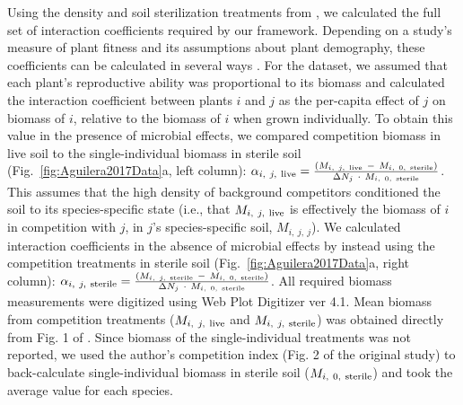 Using the density and soil sterilization treatments from \citet{Aguilera2017}, we calculated the full set of interaction coefficients required by our framework. Depending on a study's measure of plant fitness and its assumptions about plant demography, these coefficients can be calculated in several ways \citep{Weigelt2003}. For the \citet{Aguilera2017} dataset, we assumed that each plant's reproductive ability was proportional to its biomass and calculated the interaction coefficient between plants $i$ and $j$ as the per-capita effect of $j$ on biomass of $i$, relative to the biomass of $i$ when grown individually. To obtain this value in the presence of microbial effects, we compared competition biomass in live soil to the single-individual biomass in sterile soil (Fig.~\ref{fig:Aguilera2017Data}a, left column): $\alpha_{i,\ j,\ \textup{live}} = \frac{(M_{i,\ j,\ \textup{live}}\ -\ M_{i,\ 0,\ \textup{sterile}})}{\Delta N_{j}\ \cdot\  M_{i,\ 0,\ \textup{sterile}}}$.
This assumes that the high density of background competitors conditioned the soil to its species-specific state (i.e., that $M_{i,\ j,\ \textup{live}}$ is effectively the biomass of $i$ in competition with $j$, in $j$'s species-specific soil, $M_{i,\ j,\ j}$). We calculated interaction coefficients in the absence of microbial effects by instead using the competition treatments in sterile soil (Fig.~\ref{fig:Aguilera2017Data}a, right column):  $\alpha_{i,\ j,\ \textup{sterile}} = \frac{(M_{i,\ j,\ \textup{sterile}}\ -\ M_{i,\ 0,\ \textup{sterile}})}{\Delta N_{j}\ \cdot\  M_{i,\ 0,\ \textup{sterile}}}$.
All required biomass measurements were digitized using Web Plot Digitizer ver 4.1.
Mean biomass from competition treatments ($M_{i,\ j,\ \textup{live}}$ and $M_{i,\ j,\ \textup{sterile}}$) was obtained directly from Fig. 1 of \citet{Aguilera2017}. Since biomass of the single-individual treatments was not reported, we used the author's competition index (Fig. 2 of the original study) to back-calculate single-individual biomass in sterile soil ($M_{i,\ 0,\ \textup{sterile}}$) and took the average value for each species.
\par


